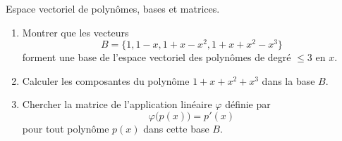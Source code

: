 \begin{exercice}\label{exoTP50001}

	Espace vectoriel de polynômes, bases et matrices.
	\begin{enumerate}

		\item
			Montrer que les vecteurs 
			\begin{equation}
				B=\{ 1,1-x,1+x-x^2,1+x+x^2-x^3 \}
			\end{equation}
			forment une base de l'espace vectoriel des polynômes de degré $\leq 3$ en $x$.

		\item
			Calculer les composantes du polynôme $1+x+x^2+x^3$ dans la base $B$.

		\item
			Chercher la matrice de l'application linéaire $\varphi$ définie par
			\begin{equation}
				\varphi\big( p(x) \big)=p'(x)
			\end{equation}
			pour tout polynôme $p(x)$ dans cette base $B$.

	\end{enumerate}

\end{exercice}
